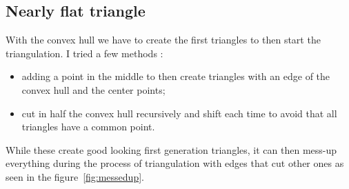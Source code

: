 \documentclass[a4paper,11pt]{article}%
\begin{document}
\subsection{Nearly flat triangle}
With the convex hull we have to create the first triangles to then start the triangulation. I tried a few methods : 
\begin{itemize}
	\item adding a point in the middle to then create triangles with an edge of the convex hull and the center points;
	\item cut in half the convex hull recursively and shift each time to avoid that all triangles have a common point. 
\end{itemize}

While these create good looking first generation triangles, it can then mess-up everything during the process of triangulation with edges that cut other ones as seen in the figure~\ref{fig:messedup}.
\end{document}
